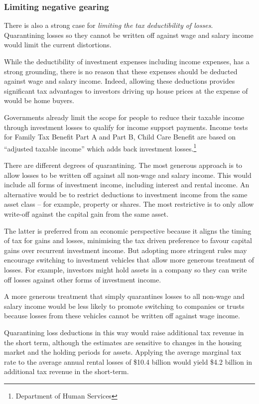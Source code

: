 \documentclass{grattan}\usepackage[]{graphicx}\usepackage[]{color}
\newcommand{\highlight}[1]{\emph{#1}}
\begin{document}
\subsubsection{Limiting negative gearing}
There is also a strong case for \highlight{limiting the tax deductibility of losses}. Quarantining losses so they cannot be written off against wage and salary income would limit the current distortions. 

While the deductibility of investment expenses including income expenses, has a strong grounding, there is no reason that these expenses should be deducted against wage and salary income. Indeed, allowing these deductions provides significant tax advantages to investors driving up house prices at the expense of would be home buyers. 

Governments already limit the scope for people to reduce their taxable income through investment losses to qualify for income support payments. Income tests for Family Tax Benefit Part A and Part B, Child Care Benefit are based on ``adjusted taxable income'' which adds back investment losses.\footnote{Department of Human Services%
}

There are different degrees of quarantining. The most generous approach is to allow losses to be written off against all non-wage and salary income.  This would include all forms of investment income, including interest and rental income. An alternative would be to restrict deductions to investment income from the same asset class -- for example, property or shares. The most restrictive is to only allow write-off against the capital gain from the same asset. 

The latter is preferred from an economic perspective because it aligns the timing of tax for gains and losses, minimising the tax driven preference to favour capital gains over recurrent investment income. But adopting more stringent rules may encourage switching to investment vehicles that allow more generous treatment of losses. For example, investors might hold assets in a company so they can write off losses against other forms of investment income.  

A more generous treatment that simply quarantines losses to all non-wage and salary income would be less likely to promote switching to companies or trusts because losses from these vehicles cannot be written off against wage income.

Quarantining loss deductions in this way would raise additional tax revenue in the short term, although the estimates are sensitive to changes in the housing market and the holding periods for assets. Applying the average marginal tax rate to the average annual rental losses of \$10.4 billion would yield \$4.2 billion in additional tax revenue in the short-term. 
\end{document}
